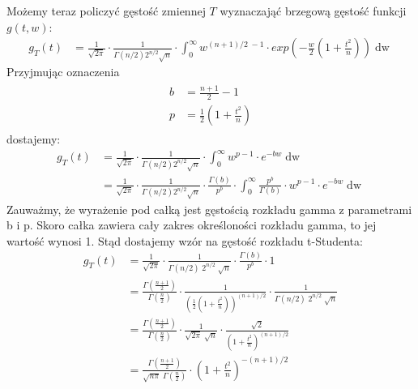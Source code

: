 \documentclass[a4paper,12pt] {article}
\begin{document}
Możemy teraz policzyć gęstość zmiennej $T$ wyznaczająć brzegową gęstość funkcji $g(t,w)$:
\begin{align}
g_T(t) &= \frac{1}{\sqrt{2 \pi}} \cdot \frac{1}{\Gamma (n/2) 2^{n/2} \sqrt{n}} \cdot \int_0^{\infty} w^{(n+1)/2 \;- 1} \cdot exp\left(-\frac{w}{2}(1+\frac{t^2}{n})\right) \mathop{dw}
\end{align}
Przyjmując oznaczenia
\begin{align}
\begin{split}
b &= \frac{n+1}{2} - 1 \\
p &= \frac{1}{2}\left(1+\frac{t^2}{n}\right)
\end{split}
\end{align}
dostajemy:
\begin{align}
g_T(t) &= \frac{1}{\sqrt{2 \pi}} \cdot \frac{1}{\Gamma (n/2) 2^{n/2} \sqrt{n}} \cdot \int_0^{\infty} w^{p-1} \cdot e^{-bw} \mathop{dw} \\
	   &= \frac{1}{\sqrt{2 \pi}} \cdot \frac{1}{\Gamma (n/2) 2^{n/2} \sqrt{n}} \cdot \frac{\Gamma (b)}{p^b} \cdot \int_0^{\infty} \frac{p^b}{\Gamma (b)} \cdot w^{p-1} \cdot e^{-bw} \mathop{dw}
\end{align}
Zauważmy, że wyrażenie pod całką jest gęstością rozkładu gamma z parametrami b i p. Skoro całka zawiera cały zakres określoności rozkładu gamma, to jej wartość wynosi 1. Stąd dostajemy wzór na gęstość rozkładu t-Studenta:
\begin{align}
g_T(t) &= \frac{1}{\sqrt{2 \pi}} \cdot \frac{1}{\Gamma (n/2)\; 2^{n/2}\; \sqrt{n}} \cdot \frac{\Gamma (b)}{p^b} \cdot 1 \\
	   &= \frac{\Gamma (\frac{n+1}{2})}{\Gamma (\frac{n}{2})} \cdot \frac{1}{\left(\frac{1}{2}(1+\frac{t^2}{n})\right)^{(n+1)/2}} \cdot \frac{1}{\Gamma (n/2)\; 2^{n/2}\; \sqrt{n}} \\
	   &= \frac{\Gamma (\frac{n+1}{2})}{\Gamma (\frac{n}{2})} \cdot \frac{1}{\sqrt{2\pi}\; \sqrt{n}} \cdot \frac{\sqrt{2}}{(1+\frac{t^2}{n})^{(n+1)/2}} \\
	   &= \frac{\Gamma (\frac{n+1}{2})}{\sqrt{n\pi}\; \Gamma (\frac{n}{2})} \cdot \left(1+\frac{t^2}{n}\right)^{-(n+1)/2}
\end{align}
\end{document}
